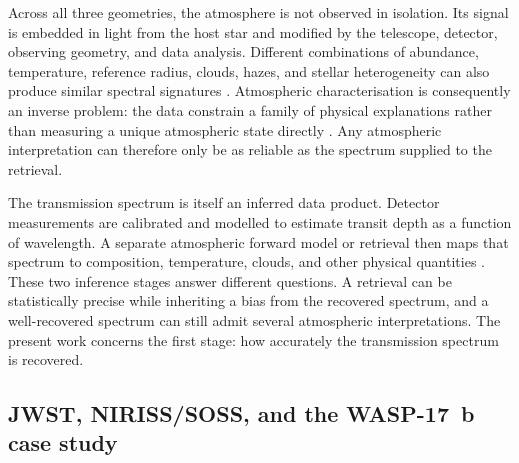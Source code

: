 Across all three geometries, the atmosphere is not observed in isolation. Its
signal is embedded in light from the host star and modified by the telescope,
detector, observing geometry, and data analysis. Different combinations of
abundance, temperature, reference radius, clouds, hazes, and stellar
heterogeneity can also produce similar spectral signatures
\citep{RackhamEtAl2018,Madhusudhan2019}. Atmospheric characterisation is
consequently an inverse problem: the data constrain a family of physical
explanations rather than measuring a unique atmospheric state directly
\citep{BarstowHeng2020}. Any atmospheric interpretation can therefore only be
as reliable as the spectrum supplied to the retrieval.


The transmission spectrum is itself an inferred data product. Detector
measurements are calibrated and modelled to estimate transit depth as a function
of wavelength. A separate atmospheric forward model or retrieval then maps that
spectrum to composition, temperature, clouds, and other physical quantities
\citep{Brown2001,Madhusudhan2019}.
These two inference stages answer different questions. A retrieval can be
statistically precise while inheriting a bias from the recovered spectrum, and
a well-recovered spectrum can still admit several atmospheric interpretations.
The present work concerns the first stage: how accurately the transmission
spectrum is recovered.

\subsection{JWST, NIRISS/SOSS, and the WASP-17~b case study}
\label{sec:jwst-soss-wasp17}
\label{sec:arecibo-to-jwst}
\label{sec:soss-wasp17}


